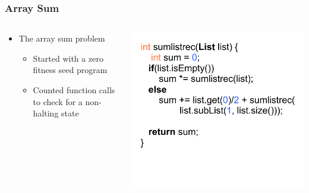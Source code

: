 \documentclass{beamer}
\begin{document}
\begin{frame}
\frametitle{Array Sum}
\begin{columns}
\begin{column}{0.5\textwidth}
\begin{itemize}
\item The array sum problem
\\
\begin{itemize}
\item Started with a zero fitness seed program
\item Counted function calls to check for a non-halting state
\end{itemize}

\end{itemize}
\end{column}
\begin{column}{0.5\textwidth}
\includegraphics[height=.65\textheight]{Illustrations/seedRec.pdf}
\end{column}
\end{columns}
\end{frame}
\end{document}
